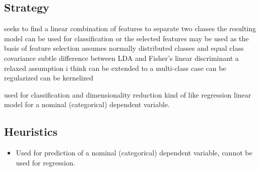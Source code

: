 \subsection{Strategy}

seeks to find a linear combination of features to separate two classes
the resulting model can be used for classification or the selected features may be used as the basis of feature selection
assumes normally distributed classes and equal class covariance
subtle difference between LDA and Fisher's linear discriminant 
	a relaxed assumption i think
can be extended to a multi-class case
can be regularized
can be kernelized



used for classification and dimensionality reduction
kind of like regression
linear model for a nominal (categorical) dependent variable.


\subsection{Heuristics}

\begin{itemize}
	\item Used for prediction of a nominal (categorical) dependent variable, cannot be used for regression.
\end{itemize}


